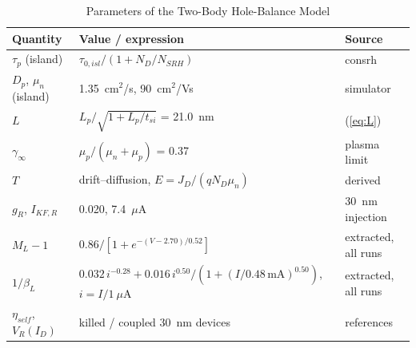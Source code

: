 \documentclass[journal]{IEEEtran}
\begin{document}
\begin{table}[!t]
\caption{Parameters of the Two-Body Hole-Balance Model}
\label{tab:model}
\centering\scriptsize\setlength{\tabcolsep}{3pt}
\begin{tabular}{@{}p{}p{}p{}@{}}
\toprule
Quantity & Value / expression & Source \\ \midrule
$\tau_p$ (island) & $\tau_{0,isl}/(1+N_D/N_{SRH})$ & consrh \\
$D_p$, $\mu_n$ (island) & 1.35~cm$^2$/s, 90~cm$^2$/Vs & simulator \\
$L$ & $L_p/\sqrt{1+L_p/t_{si}}$ = 21.0~nm & (\ref{eq:L}) \\
$\gamma_\infty$ & $\mu_p/(\mu_n+\mu_p)$ = 0.37 & plasma limit \\
$T$ & drift--diffusion, $E=J_D/(qN_D\mu_n)$ & derived \\
$g_R$, $I_{KF,R}$ & 0.020, 7.4~$\mu$A & 30~nm injection \\
$M_L-1$ & $0.86/[1+e^{-(V-2.70)/0.52}]$ & extracted, all runs \\
$1/\beta_L$ & $0.032\,i^{-0.28}+0.016\,i^{0.50}/(1+(I/0.48\,\mathrm{mA})^{0.50})$, $i=I/1~\mu$A & extracted, all runs \\
$\eta_{self}$, $V_R(I_D)$ & killed / coupled 30~nm devices & references \\ \bottomrule
\end{tabular}
\end{table}
\end{document}

